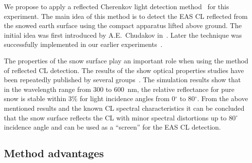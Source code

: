 \documentclass[a4paper,11pt]{article}
\begin{document}
We propose to apply a reflected Cherenkov light detection method~\cite{Ant15a} for this experiment. The main idea of this method is to detect the EAS CL reflected from the snowed earth surface using the compact apparatus lifted above ground. The initial idea was first introduced by A.E.~Chudakov in~\cite{Chu74}. Later the technique was successfully implemented in our earlier experiments~\cite{Ant15a, Ant15c}.

The properties of the snow surface play an important role when using the method of reflected CL detection. The results of the show optical properties studies have been repeatedly published by several groups~\cite{qun83, dum10,gre94,war82,hud06}. The simulation results show that in the wavelength range from 300 to 600~nm, the relative reflectance for pure snow is stable within 3\% for light incidence angles from 0$^\circ$ to 80$^\circ$. From the above mentioned results and the known CL spectral characteristics it can be concluded that the snow surface reflects the CL with minor spectral distortions up to 80$^\circ$ incidence angle and can be used as a ``screen'' for the EAS CL detection.

\subsection{Method advantages}
\end{document}
